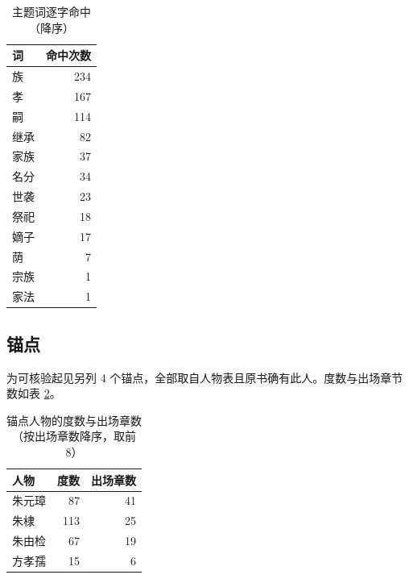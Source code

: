 \begin{table}[!t]
\centering
\caption{主题词逐字命中（降序）}
\label{tab:vocab}
\small
\begin{tabular}{lr}
\toprule
词 & 命中次数 \\
\midrule
族 & 234 \\
孝 & 167 \\
嗣 & 114 \\
继承 & 82 \\
家族 & 37 \\
名分 & 34 \\
世袭 & 23 \\
祭祀 & 18 \\
嫡子 & 17 \\
荫 & 7 \\
宗族 & 1 \\
家法 & 1 \\
\bottomrule
\end{tabular}
\end{table}



\subsection{锚点}

为可核验起见另列 4 个锚点，全部取自人物表且原书确有此人。度数与出场章节数如表 \ref{tab:anchors}。

\begin{table}[!t]
\centering
\caption{锚点人物的度数与出场章数（按出场章数降序，取前 8）}
\label{tab:anchors}
\small
\begin{tabular}{lrr}
\toprule
人物 & 度数 & 出场章数 \\
\midrule
朱元璋 & 87 & 41 \\
朱棣 & 113 & 25 \\
朱由检 & 67 & 19 \\
方孝孺 & 15 & 6 \\
\bottomrule
\end{tabular}
\end{table}

